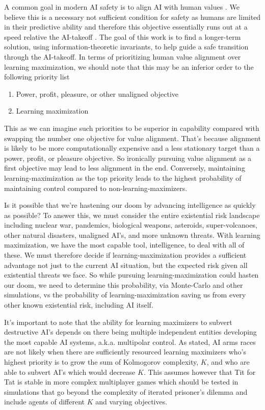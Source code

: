 \documentclass{article}
\begin{document}
A common goal in modern AI safety is to align AI with human values \cite{bostrom-values}. We believe this is a necessary not sufficient condition for safety as humans are limited in their predictive ability and therefore this objective essentially runs out at a speed relative the AI-takeoff \cite{bostrom-takeoff}. The goal of this work is to find a longer-term solution, using information-theoretic invariants, to help guide a safe transition through the AI-takeoff. In terms of prioritizing human value alignment over learning maximization, we should note that this may be an inferior order to the following priority list
\begin{enumerate}
    \item Power, profit, pleasure, or other unaligned objective
    \item Learning maximization
\end{enumerate}
This as we can imagine such priorities to be superior in capability compared with swapping the number one objective for value alignment. That's because alignment is likely to be more computationally expensive and a less stationary target than a power, profit, or pleasure objective. So ironically pursuing value alignment as a first objective may lead to less alignment in the end. Conversely, maintaining learning-maximization as the top priority leads to the highest probability of maintaining control compared to non-learning-maximizers.

Is it possible that we're hastening our doom by advancing intelligence as quickly as possible?
To answer this, we must consider the entire existential risk landscape including nuclear war\cite{wiki-nuclear-accidents}, pandemics, biological weapons, asteroids, super-volcanoes, other natural disasters, unaligned AI's, and more unknown threats. With learning maximization, we have the most capable tool, intelligence, to deal with all of these. We must therefore decide if learning-maximization provides a sufficient advantage not just to the current AI situation, but the expected risk given all existential threats we face\cite{wiki-total-expectation}. So while pursuing learning-maximization could hasten our doom, we need to determine this probability, via Monte-Carlo \cite{game-of-agi} and other simulations, vs the probability of learning-maximization saving us from every other known existential risk, including AI itself.

It's important to note that the ability for learning maximizers to subvert destructive AI's depends on there being multiple independent entities developing the most capable AI systems, a.k.a. multipolar control. As stated, AI arms races are not likely when there are sufficiently resourced learning maximizers who's highest priority is to grow the sum of Kolmogorov complexity, $K$, and who are able to subvert AI's which would decrease $K$. This assumes however that Tit for Tat\cite{axelrod1988further} is stable in more complex multiplayer games which should be tested in simulations that go beyond the complexity of iterated prisoner's dilemma \cite{fogel1993evolving} and include agents of different $K$ and varying objectives.
\end{document}
